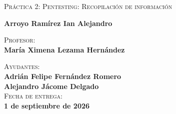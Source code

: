 \begin{titlepage}
\begin{minipage}[c][0.81\textheight][t]{0.75\textwidth}
\begin{center}
			\textsc{\LARGE Práctica 2: Pentesting: Recopilación de información}\\[8mm]
			\vspace{5mm}

			\vspace{2mm}
			\textbf{Arroyo Ramírez Ian Alejandro} \\
			\vspace{8mm}

			\textsc{Profesor:}\\
			\vspace{2mm}
			\textbf{María Ximena Lezama Hernández} \\
			\vspace{8mm}

			\textsc{Ayudantes:} \\
			\vspace{2mm}
			\textbf{Adrián Felipe Fernández Romero}\\
			\vspace{2mm}
			\textbf{Alejandro Jácome Delgado}\\
			\vspace{12mm}
			\textsc{Fecha de entrega:}\\
			\vspace{2mm}
			\textbf{1 de septiembre de 2026}\\[0.5cm]
		\end{center}
	\end{minipage}
\end{titlepage}
